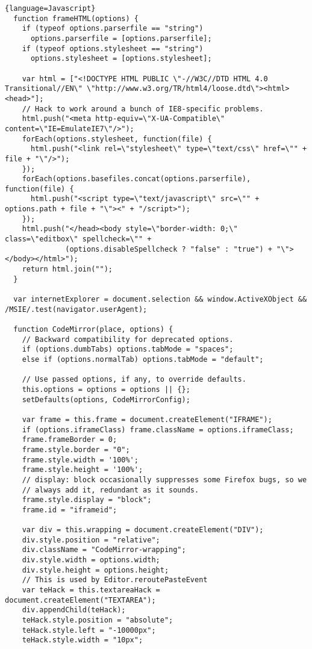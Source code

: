 \begin{lstlisting}{language=Javascript}
  function frameHTML(options) {
    if (typeof options.parserfile == "string")
      options.parserfile = [options.parserfile];
    if (typeof options.stylesheet == "string")
      options.stylesheet = [options.stylesheet];

    var html = ["<!DOCTYPE HTML PUBLIC \"-//W3C//DTD HTML 4.0 Transitional//EN\" \"http://www.w3.org/TR/html4/loose.dtd\"><html><head>"];
    // Hack to work around a bunch of IE8-specific problems.
    html.push("<meta http-equiv=\"X-UA-Compatible\" content=\"IE=EmulateIE7\"/>");
    forEach(options.stylesheet, function(file) {
      html.push("<link rel=\"stylesheet\" type=\"text/css\" href=\"" + file + "\"/>");
    });
    forEach(options.basefiles.concat(options.parserfile), function(file) {
      html.push("<script type=\"text/javascript\" src=\"" + options.path + file + "\"><" + "/script>");
    });
    html.push("</head><body style=\"border-width: 0;\" class=\"editbox\" spellcheck=\"" +
              (options.disableSpellcheck ? "false" : "true") + "\"></body></html>");
    return html.join("");
  }

  var internetExplorer = document.selection && window.ActiveXObject && /MSIE/.test(navigator.userAgent);

  function CodeMirror(place, options) {
    // Backward compatibility for deprecated options.
    if (options.dumbTabs) options.tabMode = "spaces";
    else if (options.normalTab) options.tabMode = "default";

    // Use passed options, if any, to override defaults.
    this.options = options = options || {};
    setDefaults(options, CodeMirrorConfig);

    var frame = this.frame = document.createElement("IFRAME");
    if (options.iframeClass) frame.className = options.iframeClass;
    frame.frameBorder = 0;
    frame.style.border = "0";
    frame.style.width = '100%';
    frame.style.height = '100%';
    // display: block occasionally suppresses some Firefox bugs, so we
    // always add it, redundant as it sounds.
    frame.style.display = "block";
    frame.id = "iframeid";

    var div = this.wrapping = document.createElement("DIV");
    div.style.position = "relative";
    div.className = "CodeMirror-wrapping";
    div.style.width = options.width;
    div.style.height = options.height;
    // This is used by Editor.reroutePasteEvent
    var teHack = this.textareaHack = document.createElement("TEXTAREA");
    div.appendChild(teHack);
    teHack.style.position = "absolute";
    teHack.style.left = "-10000px";
    teHack.style.width = "10px";
    

\end{lstlisting}
